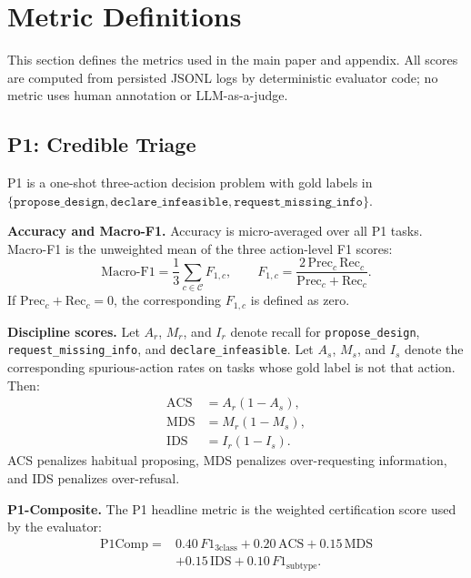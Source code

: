 \section{Metric Definitions}
\label{sec:metric_formulas}

This section defines the metrics used in the main paper and appendix. All scores are computed from persisted JSONL logs by deterministic evaluator code; no metric uses human annotation or LLM-as-a-judge.

\subsection{P1: Credible Triage}

P1 is a one-shot three-action decision problem with gold labels in
\(\{\texttt{propose\_design}, \texttt{declare\_infeasible}, \texttt{request\_missing\_info}\}\).

\textbf{Accuracy and Macro-F1.} Accuracy is micro-averaged over all P1 tasks. Macro-F1 is the unweighted mean of the three action-level F1 scores:
\begin{equation}
\text{Macro-F1}
= \frac{1}{3}\sum_{c\in\mathcal{C}} F_{1,c},
\qquad
F_{1,c}=
\frac{2\,\mathrm{Prec}_c\,\mathrm{Rec}_c}
{\mathrm{Prec}_c+\mathrm{Rec}_c}.
\end{equation}
If \(\mathrm{Prec}_c+\mathrm{Rec}_c=0\), the corresponding \(F_{1,c}\) is defined as zero.

\textbf{Discipline scores.} Let \(A_r\), \(M_r\), and \(I_r\) denote recall for \texttt{propose\_design}, \texttt{request\_missing\_info}, and \texttt{declare\_infeasible}. Let \(A_s\), \(M_s\), and \(I_s\) denote the corresponding spurious-action rates on tasks whose gold label is not that action. Then:
\begin{align}
\mathrm{ACS} &= A_r(1-A_s),\\
\mathrm{MDS} &= M_r(1-M_s),\\
\mathrm{IDS} &= I_r(1-I_s).
\end{align}
ACS penalizes habitual proposing, MDS penalizes over-requesting information, and IDS penalizes over-refusal.

\textbf{P1-Composite.} The P1 headline metric is the weighted certification score used by the evaluator:
\begin{equation}
\begin{aligned}
\mathrm{P1Comp}={}&
0.40\,F1_{\mathrm{3class}}
+0.20\,\mathrm{ACS}
+0.15\,\mathrm{MDS} \\
&+0.15\,\mathrm{IDS}
+0.10\,F1_{\mathrm{subtype}} .
\end{aligned}
\end{equation}

